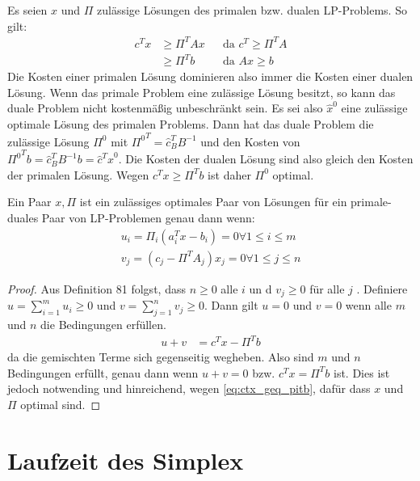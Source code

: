 Es seien $x$ und $\Pi$ zulässige Lösungen des primalen bzw. dualen LP-Problems. So gilt:
\begin{align*}
c^Tx &\geq \Pi^T A x && \text{da $c^T \geq \Pi^TA$}\\
&\geq \Pi^T b && \text{da $Ax \geq b$} \tag{Primal dom. Dual}\label{eq:ctx_geq_pitb}
\end{align*}
Die Kosten einer primalen Lösung dominieren also immer die Kosten einer dualen Lösung.
Wenn das primale Problem eine zulässige Lösung besitzt, so kann das duale Problem nicht kostenmäßig unbeschränkt sein.
Es sei also $\hat{x}^0$ eine zulässige optimale Lösung des primalen Problems.
Dann hat das duale Problem die zulässige Lösung $\Pi^0$ mit ${\Pi^0}^T = \hat{c}^T_B B^{-1}$ und den Kosten von 
${\Pi^0}^T b = \hat{c}^T_B B^{-1} b = \hat{c}^T \hat{x}^0$.
Die Kosten der dualen Lösung sind also gleich den Kosten der primalen Lösung. Wegen $c^Tx \geq \Pi^T b$ ist daher $\Pi^0$ optimal.

\begin{theorem}
Ein Paar $x,\Pi$ ist ein zulässiges optimales Paar von Lösungen für ein primale-duales Paar von LP-Problemen genau dann wenn:
\begin{align*}
u_i = \Pi_i ( a_i^T x - b_i ) = 0 \forall 1 \leq i \leq m \\
v_j = ( c_j - \Pi^T A_j ) x_j = 0 \forall 1 \leq j \leq n
\end{align*}
\end{theorem}
\begin{proof}
Aus Definition 81 folgst, dass $n \geq 0 $ alle $i$  un d $v_j \geq 0$ für alle $j$ . Definiere $u = \sum_{i=1}^m u_i \geq 0$ und $v = \sum_{j=1}^n v_j \geq 0$.
Dann gilt $u=0$ und $v=0$ wenn alle $m$ und $n$ die Bedingungen erfüllen.
\begin{align*}
u + v &= c^T x - \Pi^T b
\end{align*}
da die gemischten Terme sich gegenseitig wegheben. Also sind $m$ und $n$ Bedingungen erfüllt, genau dann wenn $u +v = 0$ bzw. $c^Tx = \Pi^T b$ ist.
Dies ist jedoch notwending und hinreichend, wegen \eqref{eq:ctx_geq_pitb}, dafür dass $x$ und $\Pi$ optimal sind.
\end{proof}

\section{Laufzeit des Simplex}

